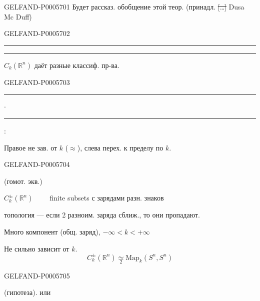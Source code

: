 \begin{GelfandAdjacentEvidence}{GELFAND-P000570}{1}
Будет рассказ. обобщение этой теор. (принадл. \sout{[…]} Dusa Mc Duff)
\end{GelfandAdjacentEvidence}
\begin{GelfandAdjacentEvidence}{GELFAND-P000570}{2}

\noindent\hfill\rule{.66cm}{.32pt}\enspace\rule{.64cm}{.32pt}\par
{}\quad \(C_k(\mathbb R^n)\) даёт разные классиф. пр-ва.
\end{GelfandAdjacentEvidence}
\begin{GelfandAdjacentEvidence}{GELFAND-P000570}{3}

\noindent\hfill\rule{.72cm}{.32pt}\enspace\(\cdot\)\enspace\rule{.91cm}{.32pt}\par
{}:

Правое не зав. от \(k\) (\(\approx\)), слева перех. к пределу по \(k\).
\end{GelfandAdjacentEvidence}
\begin{GelfandAdjacentEvidence}{GELFAND-P000570}{4}

(гомот. экв.)

\(C_k^\pm(\mathbb R^n)\qquad\) finite subsets с зарядами разн. знаков

топология — если 2 разноим. заряда сближ., то они пропадают.

Много компонент (общ. заряд), \(-\infty<k<+\infty\)

Не сильно зависит от \(k\).
\[
C_k^\pm(\mathbb R^n)\underset{2}{\simeq}\mathrm{Map}_k(S^n,S^n)
\]
\end{GelfandAdjacentEvidence}
\begin{GelfandAdjacentEvidence}{GELFAND-P000570}{5}

 (гипотеза). или
\end{GelfandAdjacentEvidence}
